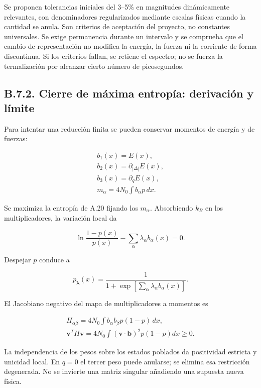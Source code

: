 \documentclass[
  spanish,
  10pt,
  a4paper,
]{article}
\begin{document}
Se proponen tolerancias iniciales del 3--5\% en magnitudes dinámicamente
relevantes, con denominadores regularizados mediante escalas físicas
cuando la cantidad se anula. Son criterios de aceptación del proyecto,
no constantes universales. Se exige permanencia durante un intervalo y
se comprueba que el cambio de representación no modifica la energía, la
fuerza ni la corriente de forma discontinua. Si los criterios fallan, se
retiene el espectro; no se fuerza la termalización por alcanzar cierto
número de picosegundos.

\subsection{B.7.2. Cierre de máxima entropía: derivación y
límite}\label{b.7.2.-cierre-de-muxe1xima-entropuxeda-derivaciuxf3n-y-luxedmite}

Para intentar una reducción finita se pueden conservar momentos de
energía y de fuerzas:

\[
\begin{gathered}
b_1(x)=E(x),\\
b_2(x)=\partial_{|\Delta|}E(x),\\
b_3(x)=\partial_qE(x),\\
m_\alpha=4N_0\int b_\alpha p\,dx.
\end{gathered} \tag{B.33}
\]

Se maximiza la entropía de A.20 fijando los \(m_\alpha\). Absorbiendo
\(k_B\) en los multiplicadores, la variación local da

\[
\ln\frac{1-p(x)}{p(x)}-\sum_\alpha\lambda_\alpha b_\alpha(x)=0.
\]

Despejar \(p\) conduce a

\[
p_{\boldsymbol\lambda}(x)=
\frac1{1+\exp[\sum_\alpha\lambda_\alpha b_\alpha(x)]}. \tag{B.34}
\]

El Jacobiano negativo del mapa de multiplicadores a momentos es

\[
\begin{gathered}
H_{\alpha\beta}=4N_0\int b_\alpha b_\beta p(1-p)\,dx,\\
\mathbf v^TH\mathbf v=4N_0\int(\mathbf v\cdot\mathbf b)^2p(1-p)dx\geq0.
\end{gathered} \tag{B.35}
\]

La independencia de los pesos sobre los estados poblados da positividad
estricta y unicidad local. En \(q=0\) el tercer peso puede anularse; se
elimina esa restricción degenerada. No se invierte una matriz singular
añadiendo una supuesta nueva física.
\end{document}
